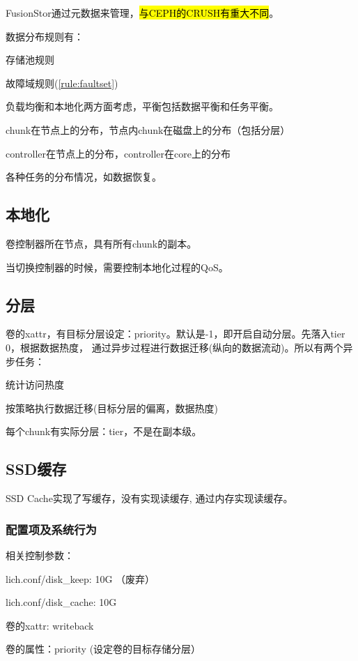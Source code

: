 FusionStor通过元数据来管理，\hl{与CEPH的CRUSH有重大不同}。

数据分布规则有：
\begin{compactitem}
\item 存储池规则
\item 故障域规则(\ref{rule:faultset})
\end{compactitem}

负载均衡和本地化两方面考虑，平衡包括数据平衡和任务平衡。

chunk在节点上的分布，节点内chunk在磁盘上的分布（包括分层）

controller在节点上的分布，controller在core上的分布

各种任务的分布情况，如数据恢复。

\subsection{本地化}

卷控制器所在节点，具有所有chunk的副本。

当切换控制器的时候，需要控制本地化过程的QoS。

\subsection{分层}

卷的xattr，有目标分层设定：priority。默认是-1，即开启自动分层。先落入tier 0，根据数据热度，
通过异步过程进行数据迁移(纵向的数据流动)。所以有两个异步任务：
\begin{compactenum}
\item 统计访问热度
\item 按策略执行数据迁移(目标分层的偏离，数据热度)
\end{compactenum}

每个chunk有实际分层：tier，不是在副本级。

\subsection{SSD缓存}

SSD Cache实现了写缓存，没有实现读缓存, 通过内存实现读缓存。

\subsubsection{配置项及系统行为}

相关控制参数：
\begin{enumbox}
\item lich.conf/disk\_keep: 10G （废弃）
\item lich.conf/disk\_cache: 10G
\item 卷的xattr: writeback
\item 卷的属性：priority (设定卷的目标存储分层）
\end{enumbox}

